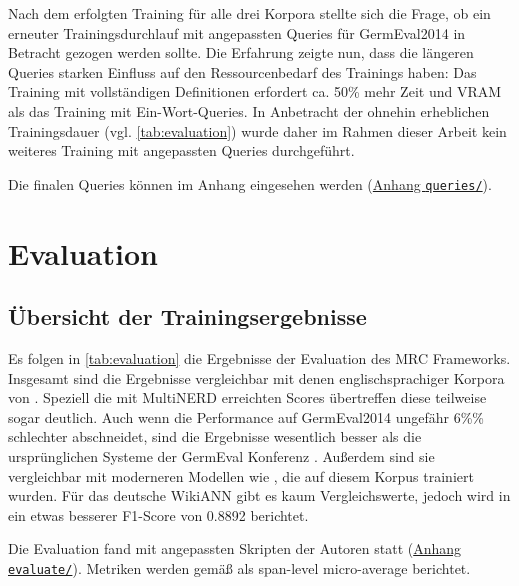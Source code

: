 Nach dem erfolgten Training für alle drei Korpora stellte sich die Frage, ob ein erneuter Trainingsdurchlauf mit angepassten Queries für GermEval2014 in Betracht gezogen werden sollte. Die Erfahrung zeigte nun, dass die längeren Queries starken Einfluss auf den Ressourcenbedarf des Trainings haben: Das Training mit vollständigen Definitionen erfordert ca. 50\% mehr Zeit und VRAM als das Training mit Ein-Wort-Queries. In Anbetracht der ohnehin erheblichen Trainingsdauer (vgl. \autoref{tab:evaluation}) wurde daher im Rahmen dieser Arbeit kein weiteres Training mit angepassten Queries durchgeführt.

Die finalen Queries können im Anhang eingesehen werden (\hyperref[app:queries]{Anhang \texttt{queries/}}).


\chapter{Evaluation}
\label{ch:Evaluation}

\section{Übersicht der Trainingsergebnisse}
\label{ch:Evaluation:sec:Übersicht_der_Trainingsergebnisse}

Es folgen in \autoref{tab:evaluation} die Ergebnisse der Evaluation des MRC Frameworks. Insgesamt sind die Ergebnisse vergleichbar mit denen englischsprachiger Korpora von . Speziell die mit MultiNERD erreichten Scores übertreffen diese teilweise sogar deutlich. Auch wenn die Performance auf GermEval2014 ungefähr 6\%\% schlechter abschneidet, sind die Ergebnisse wesentlich besser als die ursprünglichen Systeme der GermEval Konferenz \parencite{germeval2014}. Außerdem sind sie vergleichbar mit moderneren Modellen wie \textcite{riedl-pado-shootout}, die auf diesem Korpus trainiert wurden. Für das deutsche WikiANN gibt es kaum Vergleichswerte, jedoch wird in \textcite{Schiesser_2023} ein etwas besserer F1-Score von 0.8892 berichtet.

Die Evaluation fand mit angepassten Skripten der Autoren statt (\hyperref[app:evaluate]{Anhang \texttt{evaluate/}}). Metriken werden gemäß \textcite{li2019unified} als span-level micro-average berichtet.

